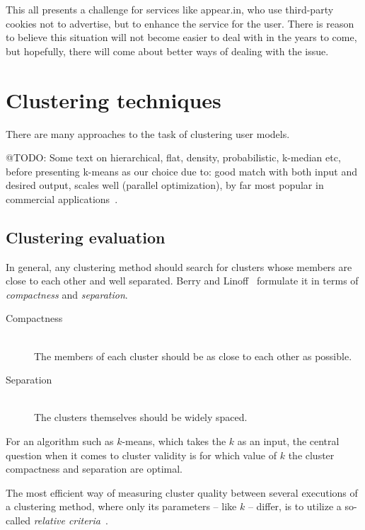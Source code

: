 This all presents a challenge for services like appear.in, who use third-party cookies not to advertise, but to enhance the service for the user. There is reason to believe this situation will not become easier to deal with in the years to come, but hopefully, there will come about better ways of dealing with the issue.

\section{Clustering techniques}
\label{survey:sec:clustering_techniques}

There are many approaches to the task of clustering user models.

@TODO: Some text on hierarchical, flat, density, probabilistic, k-median etc, before presenting k-means as our choice due to: good match with both input and desired output, scales well (parallel optimization), by far most popular in commercial applications~\cite{Berkhin2006}.

\subsection{Clustering evaluation}
\label{survey:sub:clustering_evaluation}

In general, any clustering method should search for clusters whose members are close to each other and well separated. Berry and Linoff~\cite{Berry1996} formulate it in terms of \emph{compactness} and \emph{separation}.

\begin{description}
  \item[Compactness] \hfill \\
    The members of each cluster should be as close to each other as possible.
  \item[Separation] \hfill \\
    The clusters themselves should be widely spaced.
\end{description}

For an algorithm such as $k$-means, which takes the $k$ as an input, the central question when it comes to cluster validity is for which value of $k$ the cluster compactness and separation are optimal.

The most efficient way of measuring cluster quality between several executions of a clustering method, where only its parameters -- like $k$ -- differ, is to utilize a so-called \emph{relative criteria}~\cite{Halkidi2001}.

